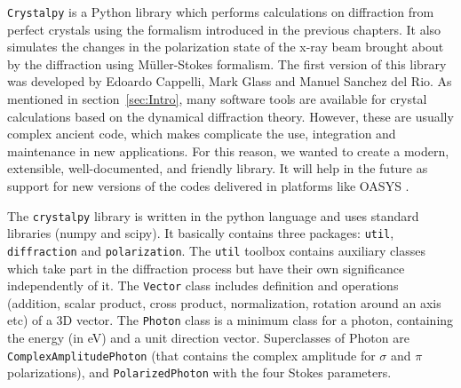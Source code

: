 \documentclass[preprint]{iucr}              %
\begin{document}
{\tt Crystalpy} is a Python library which performs calculations on diffraction
from perfect crystals using the formalism introduced in the previous chapters. It also simulates the changes in the polarization state of the x-ray beam brought
about by the diffraction using Müller-Stokes formalism. The first version of this library was developed by Edoardo Cappelli, Mark Glass and Manuel Sanchez del Rio. 
As mentioned in section~\ref{sec:Intro}, many software tools are available for crystal calculations based on the dynamical diffraction theory. However, these are usually complex ancient code, which makes complicate the use, integration and maintenance in new applications. For this reason, we wanted to create a modern, extensible, well-documented, and friendly library. It will help in the future as support for new versions of the codes delivered in platforms like OASYS \cite{codeOASYS}. 

The {\tt crystalpy} library is written in the python language and uses standard libraries (numpy and scipy).
It basically contains three
packages: {\tt util}, {\tt diffraction} and {\tt polarization}.
The {\tt util} toolbox contains auxiliary classes which take part in the diffraction
process but have their own significance independently of it.
 The {\tt Vector} class includes definition and operations (addition, scalar product, cross product, normalization, rotation around
an axis etc) of a 3D vector. 
The {\tt Photon} class is a minimum class for a photon, containing the energy (in eV) and a unit direction vector. Superclasses of Photon are {\tt ComplexAmplitudePhoton} (that contains the complex amplitude for $\sigma$ and $\pi$ polarizations), and {\tt PolarizedPhoton} with the four Stokes parameters.
\end{document}
